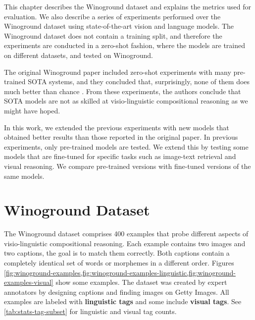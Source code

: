 This chapter describes the Winoground \cite{thrush2022winoground} dataset and explains the metrics used for evaluation. We also describe a series of experiments performed over the Winoground dataset using state-of-the-art vision and language models. The Winoground dataset does not contain a training split, and therefore the experiments are conducted in a zero-shot fashion, where the models are trained on different datasets, and tested on Winoground.

The original Winoground paper included zero-shot experiments with many pre-trained SOTA systems, and they concluded that, surprisingly, none of them does much better than chance \cite{thrush2022winoground}. From these experiments, the authors conclude that SOTA models are not as skilled at visio-linguistic compositional reasoning as we might have hoped.

In this work, we extended the previous experiments with new models that obtained better results than those reported in the original paper. In previous experiments, only pre-trained models are tested. We extend this by testing some models that are fine-tuned for specific tasks such as image-text retrieval and visual reasoning. We compare pre-trained versions with fine-tuned versions of the same models.

\section{Winoground Dataset}

The Winoground dataset \cite{thrush2022winoground} comprises 400 examples that probe different aspects of visio-linguistic compositional reasoning. Each example contains two images and two captions, the goal
is to match them correctly. Both captions contain a completely identical set of words or morphemes in a different order. Figures \cref{fig:winoground-examples,fig:winoground-examples-linguistic,fig:winoground-examples-visual} show some examples. The dataset was created by expert annotators by designing captions and finding images on Getty Images. All examples are labeled with \textbf{linguistic tags} and some include \textbf{visual tags}. See \cref{tab:stats-tag-subset} for linguistic and visual tag counts.

